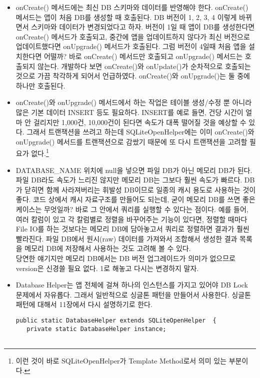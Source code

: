 \begin{itemize}
\item onCreate() 메서드에는 최신 DB 스키마와 데이터를 반영해야 한다. onCreate() 메서드는 앱이 처음 DB를 생성할 때 호출된다. DB 버전이 1, 2, 3, 4 이렇게 바뀌면서 스키마와 데이터가 변경되었다고 하자. 버전이 1일 때 앱이 DB를 생성한다면 onCreate() 메서드가 호출되고, 중간에 앱을 업데이트하지 않다가 최신 버전으로 업데이트했다면 onUpgrade() 메서드가 호출된다.
그럼 버전이 4일때 처음 앱을 설치한다면 어떨까? 바로 onCreate() 메서드만 호출되고 onUpgrade() 메서드는 호출되지 않는다. 
개발하다 보면 onCreate()와 onUpdate()가 순차적으로 호출되는 것으로 가끔 착각하게 되어서 언급하였다. onCreate()와 onUpgrade()는 둘 중에 하나만 호출된다.

\item onCreate()와 onUpgrade() 메서드에서 하는 작업은 테이블 생성/수정 뿐 아니라 많은 기본 데이터 INSERT 등도 필요하다. INSERT를 예로 들면, 건당 시간이 얼마 안 걸리지만 1,000건, 10,000건이 된다면 속도가 대폭 떨어질 것을 예상할 수 있다.
그래서 트랜잭션을 쓰려고 하는데 SQLiteOpenHelper에는 이미 onCreate()와 onUpgrade() 메서드를 트랜잭션으로 감쌌기 때문에 또 다시 트랜잭션을 고려할 필요가 없다.\footnote{이런 것이 바로 SQLiteOpenHelper가 Template Method로서 의미 있는 부분이다.}

\item DATABASE\_NAME 위치에 null을 넣으면 파일 DB가 아닌 메모리 DB가 된다. 파일 DB라도 속도가 느리진 않지만 메모리 DB는 그보다 훨씬 속도가 빠르다. DB가 닫히면 함께 사라져버리는 휘발성 DB이므로 일종의 캐시 용도로 사용하는 것이 좋다.
코드 상에서 캐시 자료구조를 만들어도 되는데, 굳이 메모리 DB를 쓰면 좋은 케이스는 무엇일까? 바로 그 안에서 쿼리를 실행할 수 있다는 점이다.
예를 들어, 여러 칼럼이 있고 각 칼럼별로 정렬을 바꾸어주는 기능이 있다면, 정렬할 때마다 File IO를 하는 것보다는 메모리 DB에 담아놓고서 쿼리로 정렬하면 결과가 훨씬 빨라진다. 
파일 DB에서 원시(raw) 데이터를 가져와서 조합해서 생성한 결과 목록을 메모리 DB에 저장해서 사용하는 것도 고려해 볼 수 있다.\\

당연한 얘기지만 메모리 DB에서는 DB 버전 업그레이드가 의미가 없으므로 version은 신경쓸 필요 없다. 1로 해놓고 다시는 변경하지 말자.

\item Database Helper는 앱 전체에 걸쳐 하나의 인스턴스를 가지고 있어야 DB Lock 문제에서 자유롭다. 
그래서 일반적으로 싱글톤 패턴을 만들어서 사용한다. 싱글톤 패턴에 대해서 11장에서 다시 설명하기로 한다.

\begin{lstlisting}[frame=single] 
public static DatabaseHelper extends SQLiteOpenHelper  {
   private static DatabaseHelper instance;
 

\end{lstlisting}
\end{itemize}
